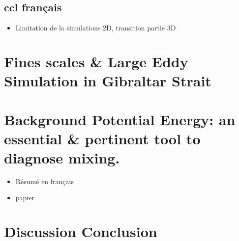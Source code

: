 \documentclass[a4paper,12pt,notitlepage,twoside]{report}
\numberwithin{equation}{section}
\begin{document}
%



\section{ccl français}
\begin{itemize}
\item Limitation de la simulations 2D, transition partie 3D
\end{itemize}


\chapter{Fines scales \& Large Eddy Simulation in Gibraltar Strait}
\label{chapGBR3D}
 





\chapter{Background Potential Energy: an essential \& pertinent tool to diagnose mixing.}
\label{chapBPE}
\begin{itemize}
\item Résumé en français
\item papier
\end{itemize}




\chapter*{Discussion Conclusion}
\end{document}
